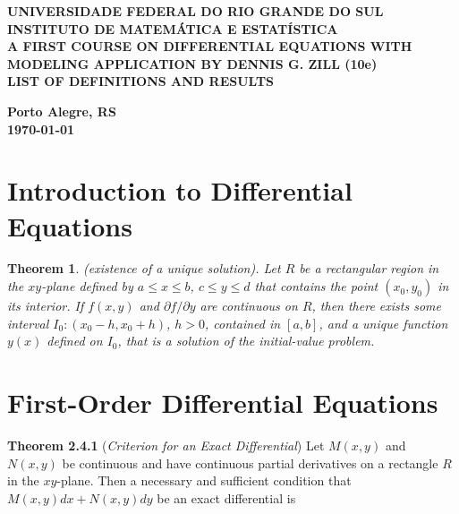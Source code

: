 \documentclass{article}
\theoremstyle{plain}
\newtheorem{thm}{Theorem}[section]
\theoremstyle{definition}
\theoremstyle{remark}
\begin{document}
\begin{center}
    \textbf{\large UNIVERSIDADE FEDERAL DO RIO GRANDE DO SUL} \\
    \textbf{\large INSTITUTO DE MATEMÁTICA E ESTATÍSTICA} \\
    \vspace{3cm}
    \textbf{\Large A FIRST COURSE ON DIFFERENTIAL EQUATIONS WITH MODELING APPLICATION BY DENNIS G. ZILL (10e)} \\
    \vspace{1cm}
    \textbf{\large LIST OF DEFINITIONS AND RESULTS} \\
    \vspace{3cm}
    
    \author{Leonardo Suarez}
    
    \vfill
    \textbf{\large Porto Alegre, RS} \\
    \textbf{\large\today} \\
\end{center}\newpage

\newpage
\tableofcontents
\newpage

\section{Introduction to Differential Equations}

\begin{thm} (existence of a unique solution).
    Let \(R\) be a rectangular region in the \(xy\)-plane defined by \(a \leq x \leq b\), \(c \leq y \leq d\) that contains the point \(\left(x_0, y_0\right)\) in its interior. If \(f(x,y)\) and \(\partial{f}/\partial{y}\) are continuous on \(R\), then there exists some interval \(I_0: (x_0 - h, x_0 + h)\), \(h > 0\), contained in \([a, b]\), and a unique function \(y(x)\) defined on \(I_0\), that is a solution of the initial-value problem. 
\end{thm}

\section{First-Order Differential Equations}

\noindent\textbf{Theorem 2.4.1} (\emph{Criterion for an Exact Differential}) Let \(M(x,y)\) and \(N(x,y)\) be continuous and have continuous partial derivatives on a rectangle \(R\) in the \(xy\)-plane. Then a necessary and sufficient condition that \(M(x,y)dx + N(x,y)dy\) be an exact differential is
\end{document}

